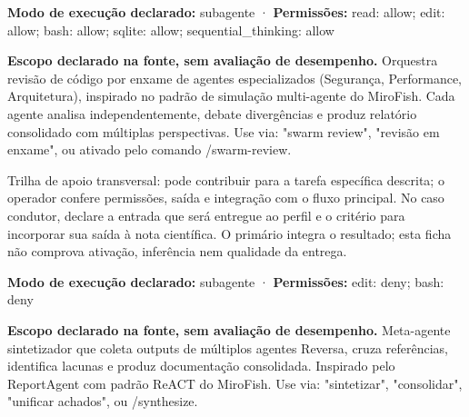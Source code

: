 \begin{arquitetura}
\textbf{Modo de execução declarado:} subagente · \textbf{Permissões:} read: allow; edit: allow; bash: allow; sqlite: allow; sequential\_thinking: allow
\end{arquitetura}


\begin{descricao}
\textbf{Escopo declarado na fonte, sem avaliação de desempenho.}
Orquestra revisão de código por enxame de agentes especializados (Segurança, Performance, Arquitetura), inspirado no padrão de simulação multi-agente do MiroFish. Cada agente analisa independentemente, debate divergências e produz relatório consolidado com múltiplas perspectivas. Use via: "swarm review", "revisão em enxame", ou ativado pelo comando /swarm-review.
\end{descricao}

\begin{funcao}
Trilha de apoio transversal: pode contribuir para a tarefa específica descrita; o operador confere permissões, saída e integração com o fluxo principal. No caso condutor, declare a entrada que será entregue ao perfil e o critério para incorporar sua saída à nota científica. O primário integra o resultado; esta ficha não comprova ativação, inferência nem qualidade da entrega.
\end{funcao}

\begin{arquitetura}
\textbf{Modo de execução declarado:} subagente · \textbf{Permissões:} edit: deny; bash: deny
\end{arquitetura}


\begin{descricao}
\textbf{Escopo declarado na fonte, sem avaliação de desempenho.}
Meta-agente sintetizador que coleta outputs de múltiplos agentes Reversa, cruza referências, identifica lacunas e produz documentação consolidada. Inspirado pelo ReportAgent com padrão ReACT do MiroFish. Use via: "sintetizar", "consolidar", "unificar achados", ou /synthesize.
\end{descricao}

